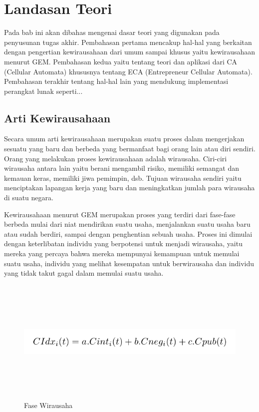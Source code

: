 \chapter{Landasan Teori}
\label{chap:teori}


 
Pada bab ini akan dibahas mengenai dasar teori yang digunakan pada penyusunan tugas akhir. Pembahasan pertama mencakup hal-hal yang berkaitan dengan pengertian kewirausahaan dari umum sampai khusus yaitu kewirausahaan menurut GEM. Pembahasan kedua yaitu tentang teori dan aplikasi dari CA (Cellular Automata) khususnya tentang ECA (Entrepreneur Cellular Automata). Pembahasan terakhir tentang hal-hal lain yang mendukung implementasi perangkat lunak seperti... 


\section{Arti Kewirausahaan}
\label{sec:artiwirausaha}

\graphicspath{{images/}}

Secara umum arti kewirausahaan merupakan suatu proses dalam mengerjakan sesuatu yang baru dan berbeda yang bermanfaat bagi orang lain atau diri sendiri. Orang yang melakukan proses kewirausahaan adalah wirausaha. Ciri-ciri wirausaha antara lain yaitu berani mengambil risiko, memiliki semangat dan kemauan keras, memiliki jiwa pemimpin, dsb. Tujuan wirausaha sendiri yaitu menciptakan lapangan kerja yang baru dan meningkatkan jumlah para wirausaha di suatu negara.


Kewirausahaan menurut GEM merupakan proses yang terdiri dari fase-fase berbeda mulai dari niat mendirikan suatu usaha, menjalankan suatu usaha baru atau sudah berdiri, sampai dengan penghentian sebuah usaha. Proses ini dimulai dengan keterlibatan individu yang berpotensi untuk menjadi wirausaha, yaitu mereka yang percaya bahwa mereka mempunyai kemampuan untuk memulai suatu usaha, individu yang melihat kesempatan untuk berwirausaha dan individu yang tidak takut gagal dalam memulai suatu usaha.
\begin{figure} 
	\centering  
	\includegraphics[width=14cm, height=6cm]{Capture}  
	\caption[Fase Wirausaha]{Fase Wirausaha} 
	\label{fig:artiwirausaha} 
\end{figure}

